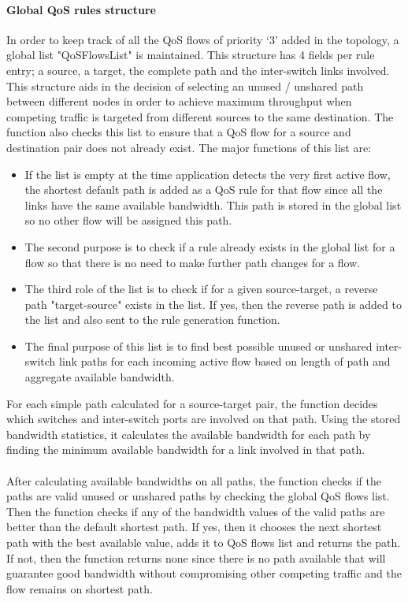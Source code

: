 \documentclass[paper=a4, fontsize=12pt]{scrartcl}	%
\numberwithin{equation}{section}		%
\numberwithin{figure}{section}			%
\numberwithin{table}{section}				%
\begin{document}
\paragraph{Global QoS rules structure}
In order to keep track of all the QoS flows of priority `3' added in the topology, a global list "QoSFlowsList" is maintained. This structure has 4 fields per rule entry; a source, a target, the complete path and the inter-switch links involved. This structure aids in the decision of selecting an unused / unshared path between different nodes in order to achieve maximum throughput when competing traffic is targeted from different sources to the same destination. The function also checks this list to ensure that a QoS flow for a source and destination pair does not already exist. The major functions of this list are:
\begin{itemize}
\item If the list is empty at the time application detects the very first active flow, the shortest default path is added as a QoS rule for that flow since all the links have the same available bandwidth. This path is stored in the global list so no other flow will be assigned this path.
\item The second purpose is to check if a rule already exists in the global list for a flow so that there is no need to make further path changes for a flow.
\item The third role of the list is to check if for a given source-target, a reverse path "target-source" exists in the list. If yes, then the reverse path is added to the list and also sent to the rule generation function.
\item The final purpose of this list is to find best possible unused or unshared inter-switch link paths for each incoming active flow based on length of path and aggregate available bandwidth.
\end{itemize}
For each simple path calculated for a source-target pair, the function decides which switches and inter-switch ports are involved on that path. Using the stored bandwidth statistics, it calculates the available bandwidth for each path by finding the minimum available bandwidth for a link involved in that path.
\\
\\
After calculating available bandwidths on all paths, the function checks if the paths are valid unused or unshared paths by checking the global QoS flows list. Then the function checks if any of the bandwidth values of the valid paths are better than the default shortest path. If yes, then it chooses the next shortest path with the best available value, adds it to QoS flows list and returns the path. If not, then the function returns none since there is no path available that will guarantee good bandwidth without compromising other competing traffic and the flow remains on shortest path.
\end{document}
